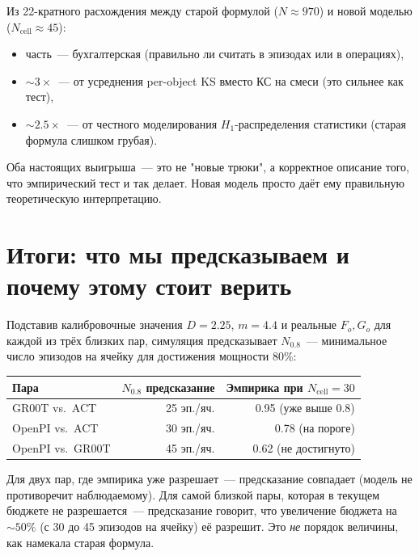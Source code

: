 \documentclass[11pt]{article}
\begin{document}
\medskip
\begin{tldr}
Из 22-кратного расхождения между старой формулой ($N \approx 970$) и новой моделью ($N_\text{cell} \approx 45$):
\begin{itemize}[leftmargin=1em, itemsep=1pt]
\item часть~--- бухгалтерская (правильно ли считать в эпизодах или в операциях),
\item $\sim 3\times$~--- от усреднения per-object KS вместо КС на смеси (это сильнее как тест),
\item $\sim 2.5\times$~--- от честного моделирования $H_1$-распределения статистики (старая формула слишком грубая).
\end{itemize}
Оба настоящих выигрыша~--- это не "новые трюки", а корректное описание того, что эмпирический тест и так делает. Новая модель просто даёт ему правильную теоретическую интерпретацию.
\end{tldr}

\section{Итоги: что мы предсказываем и почему этому стоит верить}

Подставив калибровочные значения $D = 2.25$, $m = 4.4$ и реальные $F_o, G_o$ для каждой из трёх близких пар, симуляция предсказывает $N_{0.8}$~--- минимальное число эпизодов на ячейку для достижения мощности 80\%:

\medskip
\begin{tabular}{lrr}
\toprule
Пара & $N_{0.8}$ предсказание & Эмпирика при $N_\text{cell}=30$ \\
\midrule
GR00T vs.\ ACT     & 25 эп./яч. & 0.95 (уже выше 0.8) \\
OpenPI vs.\ ACT    & 30 эп./яч. & 0.78 (на пороге) \\
OpenPI vs.\ GR00T  & 45 эп./яч. & 0.62 (не достигнуто) \\
\bottomrule
\end{tabular}
\medskip

Для двух пар, где эмпирика уже разрешает~--- предсказание совпадает (модель не противоречит наблюдаемому). Для самой близкой пары, которая в текущем бюджете не разрешается~--- предсказание говорит, что увеличение бюджета на $\sim 50\%$ (с 30 до 45 эпизодов на ячейку) её разрешит. Это \emph{не} порядок величины, как намекала старая формула.
\end{document}
